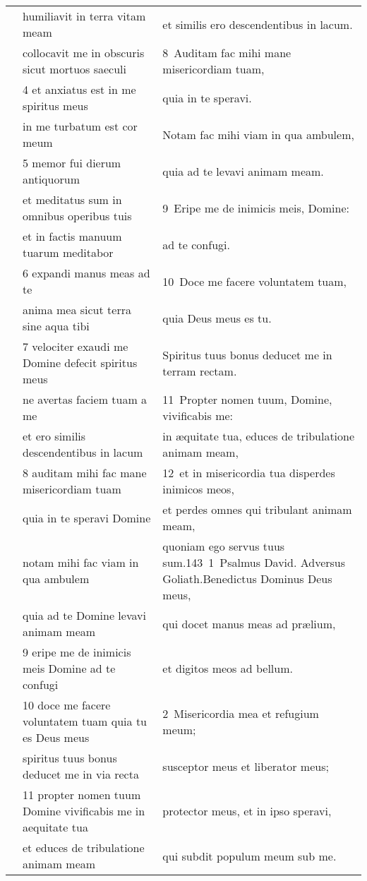 \documentclass{article}
\begin{document}
\begin{longtable}{@{}p{}p{}p{}@{}}
	&	humiliavit in terra vitam meam	&	et similis ero descendentibus in lacum.	\\
	&	collocavit me in obscuris sicut mortuos saeculi	&	8 Auditam fac mihi mane misericordiam tuam,	\\
	&	4 et anxiatus est in me spiritus meus	&	quia in te speravi.	\\
	&	in me turbatum est cor meum	&	Notam fac mihi viam in qua ambulem,	\\
	&	5 memor fui dierum antiquorum	&	quia ad te levavi animam meam.	\\
	&	et meditatus sum in omnibus operibus tuis	&	9 Eripe me de inimicis meis, Domine:	\\
	&	et in factis manuum tuarum meditabor	&	ad te confugi.	\\
	&	6 expandi manus meas ad te	&	10 Doce me facere voluntatem tuam,	\\
	&	anima mea sicut terra sine aqua tibi	&	quia Deus meus es tu.	\\
	&	7 velociter exaudi me Domine defecit spiritus meus	&	Spiritus tuus bonus deducet me in terram rectam.	\\
	&	ne avertas faciem tuam a me	&	11 Propter nomen tuum, Domine, vivificabis me:	\\
	&	et ero similis descendentibus in lacum	&	in æquitate tua, educes de tribulatione animam meam,	\\
	&	8 auditam mihi fac mane misericordiam tuam	&	12 et in misericordia tua disperdes inimicos meos,	\\
	&	quia in te speravi Domine	&	et perdes omnes qui tribulant animam meam,	\\
	&	notam mihi fac viam in qua ambulem	&	quoniam ego servus tuus sum.143 1 Psalmus David. Adversus Goliath.Benedictus Dominus Deus meus,	\\
	&	quia ad te Domine levavi animam meam	&	qui docet manus meas ad prælium,	\\
	&	9 eripe me de inimicis meis Domine ad te confugi	&	et digitos meos ad bellum.	\\
	&	10 doce me facere voluntatem tuam quia tu es Deus meus	&	2 Misericordia mea et refugium meum;	\\
	&	spiritus tuus bonus deducet me in via recta	&	susceptor meus et liberator meus;	\\
	&	11 propter nomen tuum Domine vivificabis me in aequitate tua	&	protector meus, et in ipso speravi,	\\
	&	et educes de tribulatione animam meam	&	qui subdit populum meum sub me.	\\

\end{longtable}
\end{document}
